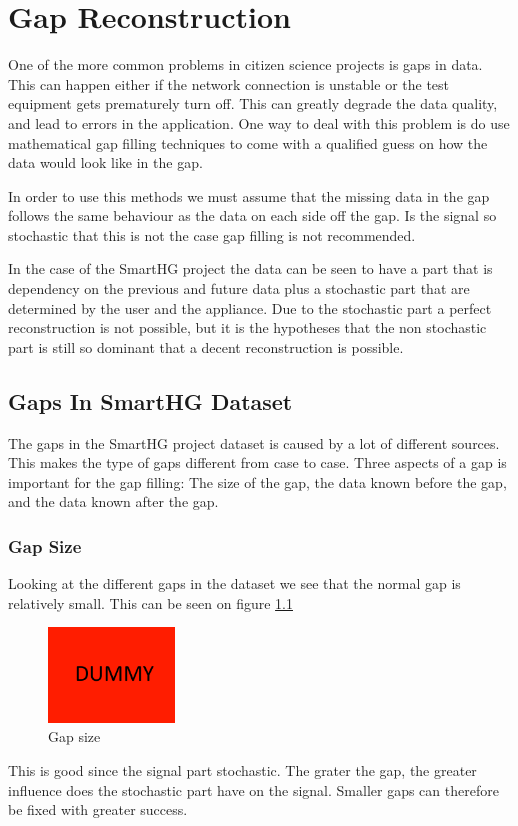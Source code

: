 \chapter{Gap Reconstruction}
One of the more common problems in citizen science projects is gaps in data. This can happen either if the network connection is unstable or the test equipment gets prematurely turn off. This can greatly degrade the data quality, and lead to errors in the application. One way to deal with this problem is do use mathematical gap filling techniques to come with a qualified guess on how the data would look like in the gap. 

In order to use this methods we must assume that the missing data in the gap follows the same behaviour as the data on each side off the gap. Is the signal so stochastic that this is not the case gap filling is not recommended\citep{RefWorks:10}. 

In the case of the SmartHG project the data can be seen to have a part that is dependency on the previous and future data plus a stochastic part that are determined by the user and the appliance. Due to the stochastic part a perfect reconstruction is not possible, but it is the hypotheses that the non stochastic part is still so dominant that a decent reconstruction is possible. 
\section{Gaps In SmartHG Dataset}
The gaps in the SmartHG project dataset is caused by a lot of different sources. This makes the type of gaps different from case to case. Three aspects of a gap is important for the gap filling: The size of the gap, the data known before the gap, and the data known after the gap. 
\subsection{Gap Size}
Looking at the different gaps in the dataset we see that the normal gap is relatively small. This can be seen on figure \ref{fig:GapSize}
\begin{figure}[H]
\centering
\includegraphics[width=0.3\textwidth]{billeder/DUMMY.png}
\caption{Gap size}
\label{fig:GapSize}
\end{figure}
This is good since the signal part stochastic. The grater the gap, the greater influence does the stochastic part have on the signal. Smaller gaps can therefore be fixed with greater success. 
